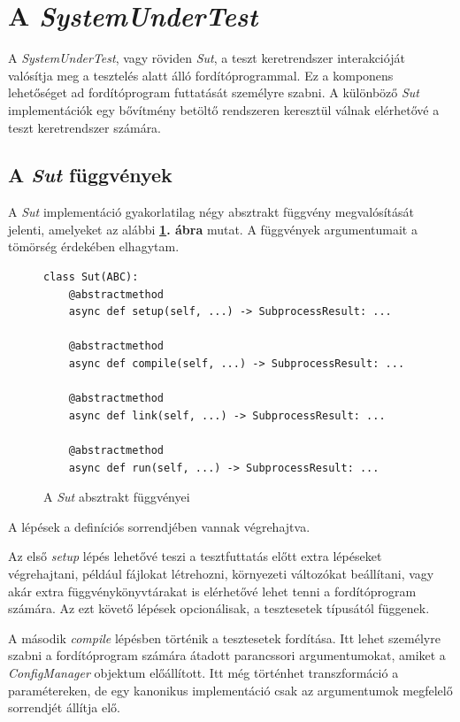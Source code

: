\section{A \textit{SystemUnderTest}}

    A \textit{SystemUnderTest}, vagy röviden \textit{Sut}, a teszt keretrendszer interakcióját valósítja meg a
    tesztelés alatt álló fordítóprogrammal. Ez a komponens lehetőséget ad fordítóprogram futtatását személyre szabni. A
    különböző \textit{Sut} implementációk egy bővítmény betöltő rendszeren keresztül válnak elérhetővé a teszt
    keretrendszer számára.

    \subsection{A \textit{Sut} függvények}

        A \textit{Sut} implementáció gyakorlatilag négy absztrakt függvény megvalósítását jelenti, amelyeket az alábbi
        \textbf{\ref{fig:sut-functions}. ábra} mutat. A függvények argumentumait a tömörség érdekében elhagytam.

        \begin{figure}[ht]
            \centering
            \begin{verbatim}
class Sut(ABC):
    @abstractmethod
    async def setup(self, ...) -> SubprocessResult: ...

    @abstractmethod
    async def compile(self, ...) -> SubprocessResult: ...

    @abstractmethod
    async def link(self, ...) -> SubprocessResult: ...

    @abstractmethod
    async def run(self, ...) -> SubprocessResult: ...
        \end{verbatim}
            \caption{\label{fig:sut-functions} A \textit{Sut} absztrakt függvényei}
        \end{figure}

        A lépések a definíciós sorrendjében vannak végrehajtva.

        Az első \textit{setup} lépés lehetővé teszi a tesztfuttatás előtt extra lépéseket végrehajtani, például
        fájlokat létrehozni, környezeti változókat beállítani, vagy akár extra függvénykönyvtárakat is elérhetővé lehet
        tenni a fordítóprogram számára. Az ezt követő lépések opcionálisak, a tesztesetek típusától függenek.

        A második \textit{compile} lépésben történik a tesztesetek fordítása. Itt lehet személyre szabni a
        fordítóprogram számára átadott parancssori argumentumokat, amiket a \textit{ConfigManager} objektum
        előállított. Itt még történhet transzformáció a paramétereken, de egy kanonikus implementáció csak az
        argumentumok megfelelő sorrendjét állítja elő.

